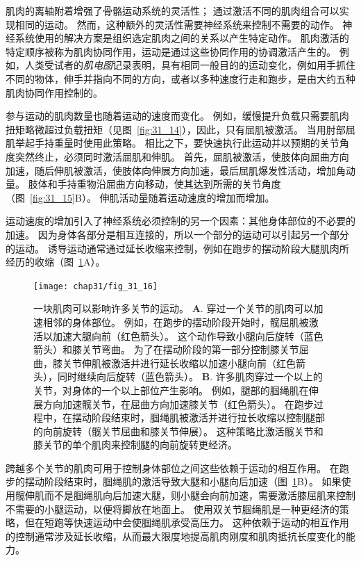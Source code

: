 肌肉的离轴附着增强了骨骼运动系统的灵活性；
通过激活不同的肌肉组合可以实现相同的运动。
然而，这种额外的灵活性需要神经系统来控制不需要的动作。
神经系统使用的解决方案是组织选定肌肉之间的关系以产生特定动作。
肌肉激活的特定顺序被称为肌肉协同作用，运动是通过这些协同作用的协调激活产生的。
例如，人类受试者的\textit{肌电图}记录表明，具有相同一般目的的运动变化，例如用手抓住不同的物体，伸手并指向不同的方向，或者以多种速度行走和跑步，是由大约五种肌肉协同作用控制的。


参与运动的肌肉数量也随着运动的速度而变化。
例如，缓慢提升负载只需要肌肉扭矩略微超过负载扭矩（见图~\ref{fig:31_14}），因此，只有屈肌被激活。
当用肘部屈肌举起手持重量时使用此策略。
相比之下，要快速执行此运动并以预期的关节角度突然终止，必须同时激活屈肌和伸肌。
首先，屈肌被激活，使肢体向屈曲方向加速，随后伸肌被激活，使肢体向伸展方向加速，最后屈肌爆发性活动，增加角动量。
肢体和手持重物沿屈曲方向移动，使其达到所需的关节角度（图~\ref{fig:31_15}B）。 
伸肌活动量随着运动速度的增加而增加。


运动速度的增加引入了神经系统必须控制的另一个因素：其他身体部位的不必要的加速。
因为身体各部分是相互连接的，所以一个部分的运动可以引起另一个部分的运动。
诱导运动通常通过延长收缩来控制，例如在跑步的摆动阶段大腿肌肉所经历的收缩（图~\ref{fig:31_16}A）。


\begin{figure}[htbp]
	\centering
	\texttt{[image: chap31/fig\_31\_16]}
	\caption{一块肌肉可以影响许多关节的运动。
	\textbf{A}. 穿过一个关节的肌肉可以加速相邻的身体部位。
	例如，在跑步的摆动阶段开始时，髋屈肌被激活以加速大腿向前（红色箭头）。
	这个动作导致小腿向后旋转（蓝色箭头）和膝关节弯曲。
	为了在摆动阶段的第一部分控制膝关节屈曲，膝关节伸肌被激活并进行延长收缩以加速小腿向前（红色箭头），同时继续向后旋转（蓝色箭头）。
	\textbf{B}. 许多肌肉穿过一个以上的关节，对身体的一个以上部位产生影响。
	例如，腿部的腘绳肌在伸展方向加速髋关节，在屈曲方向加速膝关节（红色箭头）。
	在跑步过程中，在摆动阶段结束时，腘绳肌被激活并进行拉长收缩以控制腿部的向前旋转（髋关节屈曲和膝关节伸展）。
	这种策略比激活髋关节和膝关节的单个肌肉来控制腿的向前旋转更经济。}
	\label{fig:31_16}
\end{figure}


跨越多个关节的肌肉可用于控制身体部位之间这些依赖于运动的相互作用。
在跑步的摆动阶段结束时，腘绳肌的激活导致大腿和小腿向后加速（图~\ref{fig:31_16}B）。
如果使用髋伸肌而不是腘绳肌向后加速大腿，则小腿会向前加速，需要激活膝屈肌来控制不需要的小腿运动，以便将脚放在地面上。
使用双关节腘绳肌是一种更经济的策略，但在短跑等快速运动中会使腘绳肌承受高压力。
这种依赖于运动的相互作用的控制通常涉及延长收缩，从而最大限度地提高肌肉刚度和肌肉抵抗长度变化的能力。


